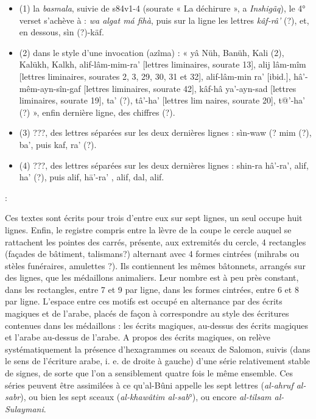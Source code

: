 \begin{itemize}
    \item (1) la \textit{basmala}, suivie de s84v1-4 (sourate « La déchirure », a
\textit{Inshigãq}), le 4° verset s'achève à : \textit{wa algat má fihà}, puis sur la ligne
les lettres \textit{kâf-râ'} (?), et, en dessous, sìn (?)-käf.
\item (2) dans le style d'une invocation (azîma) : « yâ Nüh, Banüh, Kali
(2), Kalükh, Kalkh, alif-lâm-mim-ra' [lettres liminaires, sourate 13], alij lâm-mîm [lettres liminaires, sourates 2, 3, 29, 30, 31 et 32], alif-lâm-min
ra' [ibid.], hâ'-mêm-ayn-sîn-gaf [lettres liminaires, sourate 42], kâf-hâ
ya'-ayn-sad [lettres liminaires, sourate 19], ta' (?), tâ'-ha' [lettres lim naires, sourate 20], t@'-ha' (?) », enfin dernière ligne, des chiffres (?).
\item (3) ???, des lettres séparées sur les deux dernières lignes : sìn-waw (?
mim (?), ba', puis kaf, ra' (?).
\item (4) ???, des lettres séparées sur les deux dernières lignes : shin-ra
hâ'-ra', alif, ha' (?), puis alif, hā'-ra' , alif, dal, alif.
\end{itemize}:




Ces textes sont écrits pour trois d'entre eux sur sept lignes, un seul occupe huit lignes. Enfin, le registre compris entre la lèvre de la coupe le cercle auquel se rattachent les pointes des carrés, présente, aux extremités du cercle, 4 rectangles (façades de bâtiment, talismans?) alternant avec  4 formes cintrées (mihrabs ou stèles funéraires, amulettes ?). Ils contiennent les mêmes bâtonnets, arrangés sur des lignes, que les médaillons animaliers. Leur nombre est à peu près constant, dans les rectangles, entre 7 et 9 par ligne, dans les formes cintrées, entre 6 et 8 par ligne. L'espace entre ces motifs est occupé en alternance par des écrits magiques et de l'arabe, placés de façon à correspondre au style des écritures contenues dans les médaillons : les écrits magiques, au-dessus des écrits magiques et l'arabe au-dessus de l'arabe. A propos des écrits magiques, on relève systématiquement la présence d'hexagrammes ou sceaux de Salomon, suivis (dans le sens de l'écriture arabe, i. e. de droite à gauche) d'une série relativement stable de signes, de sorte que l'on a sensiblement quatre fois le même ensemble. Ces séries peuvent être assimilées à ce qu'al-Bûni appelle les sept lettres (\textit{al-ahruf al-sabr}), ou bien les
sept sceaux (\textit{al-khawâtim al-sab}°), ou encore \textit{al-tilsam al-Sulaymani}. 

